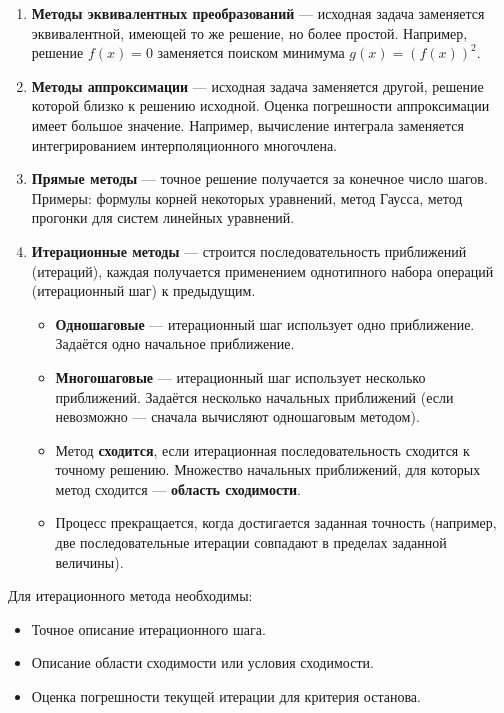 \documentclass[14pt,a4paper]{extarticle}
\begin{document}
\begin{enumerate}
    \item \textbf{Методы эквивалентных преобразований} --- исходная задача заменяется эквивалентной, имеющей то же решение, но более простой. Например, решение $f(x) = 0$ заменяется поиском минимума $g(x) = (f(x))^2$.

    \item \textbf{Методы аппроксимации} --- исходная задача заменяется другой, решение которой близко к решению исходной. Оценка погрешности аппроксимации имеет большое значение. Например, вычисление интеграла заменяется интегрированием интерполяционного многочлена.

    \item \textbf{Прямые методы} --- точное решение получается за конечное число шагов. Примеры: формулы корней некоторых уравнений, метод Гаусса, метод прогонки для систем линейных уравнений.

    \item \textbf{Итерационные методы} --- строится последовательность приближений (итераций), каждая получается применением однотипного набора операций (итерационный шаг) к предыдущим.
    \begin{itemize}
        \item \textbf{Одношаговые} --- итерационный шаг использует одно приближение. Задаётся одно начальное приближение.
        \item \textbf{Многошаговые} --- итерационный шаг использует несколько приближений. Задаётся несколько начальных приближений (если невозможно --- сначала вычисляют одношаговым методом).
        \item Метод \textbf{сходится}, если итерационная последовательность сходится к точному решению. Множество начальных приближений, для которых метод сходится --- \textbf{область сходимости}.
        \item Процесс прекращается, когда достигается заданная точность (например, две последовательные итерации совпадают в пределах заданной величины).
    \end{itemize}
\end{enumerate}

Для итерационного метода необходимы:
\begin{itemize}
    \item Точное описание итерационного шага.
    \item Описание области сходимости или условия сходимости.
    \item Оценка погрешности текущей итерации для критерия останова.
\end{itemize}
\end{document}
